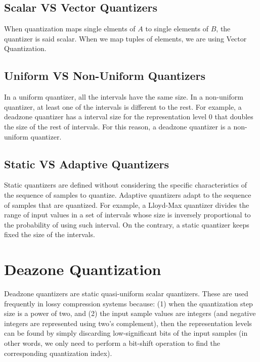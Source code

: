 \subsection{Scalar VS Vector Quantizers}

When quantization maps single elments of $A$ to single elements of
$B$, the quantizer is said scalar. When we map tuples of elements, we
are using Vector Quantization.

\subsection{Uniform VS Non-Uniform Quantizers}

In a uniform quantizer, all the intervals have the same size. In a
non-uniform quantizer, at least one of the intervals is different to
the rest. For example, a deadzone quantizer has a interval size for
the representation level 0 that doubles the size of the rest of
intervals. For this reason, a deadzone quantizer is a non-uniform
quantizer.

\subsection{Static VS Adaptive Quantizers}

Static quantizers are defined without considering the specific
characteristics of the sequence of samples to quantize. Adaptive
quantizers adapt to the sequence of samples that are quantized. For
example, a Lloyd-Max quantizer divides the range of input values in a
set of intervals whose size is inversely proportional to the
probability of using such interval. On the contrary, a static
quantizer keeps fixed the size of the intervals.

\section{Deazone Quantization~\cite{vruiz__scalar_quantization}}

Deadzone quantizers are static quasi-uniform scalar quantizers. These
are used frequently in lossy compression systems because: (1) when the
quantization step size is a power of two, and (2) the input sample
values are integers (and negative integers are represented using two's
complement), then the representation levels can be found by simply
discarding low-significant bits of the input samples (in other words,
we only need to perform a bit-shift operation to find the corresponding quantization index).

